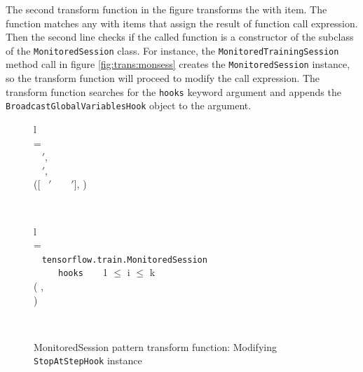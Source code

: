 The second transform function in the figure transforms the with item.
The function matches any with items that assign the result of function
call expression.
Then the second line checks if the called function is a constructor
of the subclass of the {\tt MonitoredSession} class.
For instance, the {\tt MonitoredTrainingSession} method call in
figure \ref{fig:trans:monsess} creates the {\tt MonitoredSession} instance, so
the transform function will proceed to modify the call expression. 
The transform function searches for the {\tt hooks} keyword argument
and appends the {\tt BroadcastGlobalVariablesHook} object to the
argument.
   

\begin{figure}[ht!]
 \noindent
  \begin{tabular}{l}
     \\
    \tstmt{\kwith ~ \mul{\nwithitem} ~ \kcolon ~ \mul{\nstmt}}{\smodenv} = \\
    \inden \ktlet ~ \mul{\nwithitem}$'$,  \kteq ~ \twwithitem{\mul{\nwithitem}}{\smodenv} \ktin \\
    \inden \ktlet ~ \mul{\nstmt}$'$,  \kteq ~  \ktin \\

    \inden ([\kwith ~ \mul{\nwithitem}$'$ ~ \kcolon ~ \mul{\nstmt}$'$], )
  \end{tabular}\\

  \begin{tabular}{l}
    \typdesc{\fkwithitem & : & \dwithitem ~ $\rightarrow$ ~ \dmodenv ~ $\rightarrow$ ~ (\dwithitem ~ $\times$ \dmodenv)}  \\
     = \\

    \inden \ktif ~  \ktsubtysubs{\smodenv} {\tt tensorflow.train.MonitoredSession} ~ \ktthen \\
    \inden\inden \ktif ~  ~ \kteq ~ {\tt hooks} ~ \ktwhen ~ 1 $\leq$ i $\leq$ k ~ \ktthen\\
    \inden\inden\inden( , \\
    \inden\inden\inden\inden {}) \\
  \end{tabular}\\\vpar
\caption{MonitoredSession pattern transform function: Modifying {\tt StopAtStepHook} instance}
  \label{fig:trans:monsessrule}
\end{figure}
